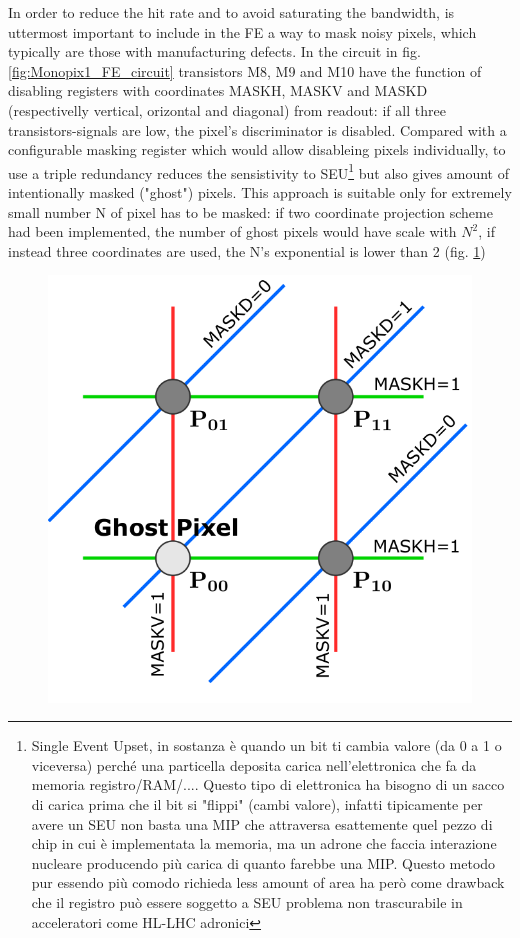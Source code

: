     
    In order to reduce the hit rate and to avoid saturating the bandwidth, is uttermost important to include in the FE a way to mask noisy pixels, which typically are those with manufacturing defects.
    In the circuit in fig. \ref{fig:Monopix1_FE_circuit} transistors M8, M9 and M10 have the function of disabling registers with coordinates MASKH, MASKV and MASKD (respectivelly vertical, orizontal and diagonal) from readout: if all three transistors-signals are low, the pixel's discriminator is disabled. 
    Compared with a configurable masking register which would allow disableing pixels individually, to use a triple redundancy reduces the sensistivity to SEU\footnote{Single Event Upset, in sostanza è quando un bit ti cambia valore (da 0 a 1 o viceversa) perché una particella deposita carica nell'elettronica che fa da memoria registro/RAM/.... Questo tipo di elettronica ha bisogno di un sacco di carica prima che il bit si "flippi" (cambi valore), infatti tipicamente per avere un SEU non basta una MIP che attraversa esattemente quel pezzo di chip in cui è implementata la memoria, ma un adrone che faccia interazione nucleare producendo più carica di quanto farebbe una MIP. Questo metodo pur essendo più comodo richieda less amount of area ha però come drawback che il registro può essere soggetto a SEU problema non trascurabile in acceleratori come HL-LHC adronici} but also gives amount of intentionally masked ("ghost") pixels.
    This approach is suitable only for extremely small number N of pixel has to be masked: if two coordinate projection scheme had been implemented, the number of ghost pixels would have scale with $N^2$, if instead three coordinates are used, the N's exponential is lower than 2 (fig. \ref{fig:masking_scheme})
       \begin{figure}[h!]
        \centering
        \includegraphics[width=.3\linewidth]{figures/Monopix1/masking_scheme.png}
        \caption{}
        \label{fig:masking_scheme}
    \end{figure}

